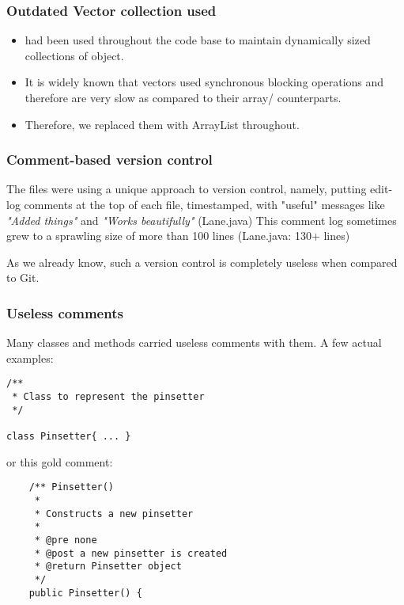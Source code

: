\subsubsection{Outdated Vector collection used}

\begin{itemize}
	\item {} had been used throughout the code base to maintain dynamically sized collections of object.
	\item It is widely known that vectors used synchronous blocking operations and therefore are very slow as compared to their array/ counterparts.
	\item Therefore, we replaced them with ArrayList throughout.
\end{itemize}

\subsubsection{Comment-based version control}

The files were using a unique approach to version control, namely, putting edit-log comments at the top of each file, timestamped, with "useful" messages like \textit{"Added things"} and \textit{"Works beautifully"} (\textrm{Lane.java}) This comment log sometimes grew to a sprawling size of more than 100 lines (Lane.java: 130+ lines)

As we already know, such a version control is completely useless when compared to Git.

\subsubsection{Useless comments}

Many classes and methods carried useless comments with them. A few actual examples:

\begin{verbatim}
/**
 * Class to represent the pinsetter
 */

class Pinsetter{ ... }
\end{verbatim}

or this gold comment:

\begin{verbatim}
	/** Pinsetter()
	 *
	 * Constructs a new pinsetter
	 *
	 * @pre none
	 * @post a new pinsetter is created
	 * @return Pinsetter object
	 */
	public Pinsetter() {
\end{verbatim}

